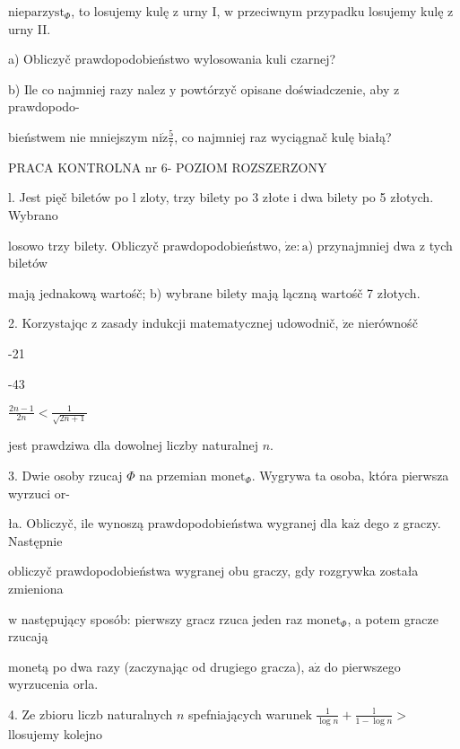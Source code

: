 \documentclass[a4paper,12pt]{article}
\begin{document}
$\mathrm{n}\mathrm{i}\mathrm{e}\mathrm{p}\mathrm{a}\mathrm{r}\mathrm{z}\mathrm{y}\mathrm{s}\mathrm{t}_{\Phi}$, to losujemy kulę $\mathrm{z}$ urny I, $\mathrm{w}$ przeciwnym przypadku losujemy kulę $\mathrm{z}$ urny II.

a) Obliczyč prawdopodobieństwo wylosowania kuli czarnej?

b) Ile co najmniej razy nalez $\mathrm{y}$ powtórzyč opisane doświadczenie, aby $\mathrm{z}$ prawdopodo-

bieństwem nie mniejszym $\displaystyle \mathrm{n}\mathrm{i}\dot{\mathrm{z}}\frac{5}{7}$, co najmniej raz wyciągnač kulę białą?





PRACA KONTROLNA nr 6- POZIOM ROZSZERZONY

l. Jest pięč biletów po l zloty, trzy bilety po 3 złote $\mathrm{i}$ dwa bilety po 5 złotych. Wybrano

losowo trzy bilety. Obliczyč prawdopodobieństwo, $\dot{\mathrm{z}}\mathrm{e}:\mathrm{a}$) przynajmniej dwa $\mathrm{z}$ tych biletów

mają jednakową wartośč; b) wybrane bilety mają lączną wartośč 7 złotych.

2. Korzystajqc $\mathrm{z}$ zasady indukcji matematycznej udowodnič, $\dot{\mathrm{z}}\mathrm{e}$ nierównośč

-21

-43

$\displaystyle \frac{2n-1}{2n}<\frac{1}{\sqrt{2n+1}}$

jest prawdziwa dla dowolnej liczby naturalnej $n.$

3. Dwie osoby rzucaj $\Phi$ na przemian $\mathrm{m}\mathrm{o}\mathrm{n}\mathrm{e}\mathrm{t}_{\Phi}$. Wygrywa ta osoba, która pierwsza wyrzuci or-

ła. Obliczyč, ile wynoszą prawdopodobieństwa wygranej dla $\mathrm{k}\mathrm{a}\dot{\mathrm{z}}$ dego $\mathrm{z}$ graczy. Następnie

obliczyč prawdopodobieństwa wygranej obu graczy, gdy rozgrywka została zmieniona

$\mathrm{w}$ następujący sposób: pierwszy gracz rzuca jeden raz $\mathrm{m}\mathrm{o}\mathrm{n}\mathrm{e}\mathrm{t}_{\Phi}$, a potem gracze rzucają

monetą po dwa razy (zaczynając od drugiego gracza), $\mathrm{a}\dot{\mathrm{z}}$ do pierwszego wyrzucenia orla.

4. Ze zbioru liczb naturalnych $n$ spefniających warunek $\displaystyle \frac{1}{\log n}+\frac{\mathrm{l}}{1-\log n}>$ llosujemy kolejno
\end{document}
